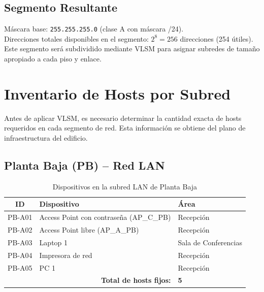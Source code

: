 \documentclass[letterpaper,11pt]{article}
\begin{document}
\subsection{Segmento Resultante}

\begin{center}
\end{center}

Máscara base: \texttt{255.255.255.0} (clase A con máscara /24). \\
Direcciones totales disponibles en el segmento: $2^{8} = 256$ direcciones (254 útiles). \\
Este segmento será subdividido mediante VLSM para asignar subredes de tamaño apropiado a cada piso y enlace.

\section{Inventario de Hosts por Subred}

Antes de aplicar VLSM, es necesario determinar la cantidad exacta de hosts requeridos en cada segmento de red. Esta información se obtiene del plano de infraestructura del edificio.

\subsection{Planta Baja (PB) -- Red LAN}

\begin{table}[H]
\centering
\caption{Dispositivos en la subred LAN de Planta Baja}
\begin{tabular}{|c|l|l|}
\hline
\textbf{ID} & \textbf{Dispositivo} & \textbf{Área} \\
\hline
PB-A01 & Access Point con contraseña (AP\_C\_PB) & Recepción \\
PB-A02 & Access Point libre (AP\_A\_PB) & Recepción \\
PB-A03 & Laptop 1 & Sala de Conferencias \\
PB-A04 & Impresora de red & Recepción \\
PB-A05 & PC 1 & Recepción \\
\hline
\multicolumn{2}{|r|}{\textbf{Total de hosts fijos:}} & \textbf{5} \\
\hline
\end{tabular}
\end{table}
\end{document}
